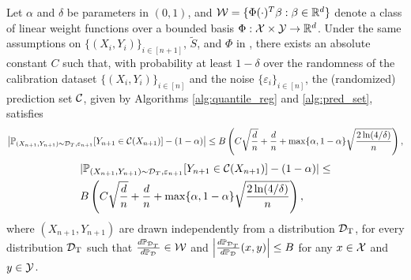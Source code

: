 \begin{corollary}
\label{cor: distr-shift}
     Let $\alpha$ and $\delta$ be parameters in $(0,1)$, and ${\cal W} = \{\Phi(\cdot)^T \beta :\beta \in \mathbb{R}^d\}$ denote a class of linear weight functions over a bounded basis $\Phi : {\cal X} \times {\cal Y} \to \mathbb{R}^d$. 
     Under the same assumptions on $\{(X_i, Y_i)\}_{i\in [n+1]}$, $\tilde S$, and $\Phi$  in , there exists an absolute constant $C$ such that, with probability at least $1-\delta$ over the randomness of the calibration dataset $\{(X_i,Y_i)\}_{i\in [n]}$ and the noise $\{\varepsilon_i\}_{i \in [n]}$, the (randomized) prediction set ${\cal C}$, given by Algorithms \ref{alg:quantile_reg} and \ref{alg:pred_set}, satisfies
     \ifarxiv
     \begin{align*}
        \left|\mathbb{P}_{(X_{n+1}, Y_{n+1})\sim {\cal D}_T, \varepsilon_{n+1}} [Y_{n+1} \in {\cal C}(X_{n+1})] - (1-\alpha)\right|\leq 
        B \left( C \sqrt{\frac{d}{n}} + \frac{d}{n} +\max \{\alpha, 1-\alpha\}\sqrt{\frac{2\ln(4/\delta)}{n}}  \right) ,
     \end{align*}     
     \else
    \begin{align*}
        &|\mathbb{P}_{(X_{n+1}, Y_{n+1})\sim {\cal D}_T, \varepsilon_{n+1}} [Y_{n+1} \in {\cal C}(X_{n+1})] - (1-\alpha)|\leq \\
        &B \left( C \sqrt{\frac{d}{n}} + \frac{d}{n} +\max \{\alpha, 1-\alpha\}\sqrt{\frac{2\ln(4/\delta)}{n}}  \right) ,
    \end{align*}
    \fi
     where $(X_{n+1},Y_{n+1})$ are drawn independently from a distribution ${\cal D}_{\text{T}}$, for every distribution ${\cal D}_{\text{T}}$ such that $\frac{d\mathbb{P}_{{\cal D}_{T}}}{d\mathbb{P}_{{\cal D}}} \in {\cal W}$ and $ \left|\frac{d\mathbb{P}_{{\cal D}_{T}}}{d\mathbb{P}_{{\cal D}}}(x,y) \right|\leq B$ for any $x \in {\cal X}$ and $y \in {\cal Y}$.  
\end{corollary}




